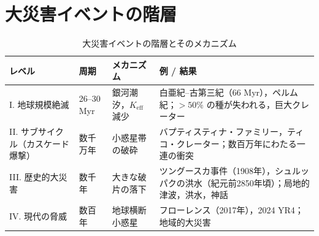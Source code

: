 \documentclass[12pt,a4paper]{article}
\begin{document}
	\section{大災害イベントの階層}
	\begin{table}[!ht]
		\centering
		\caption{大災害イベントの階層とそのメカニズム}
		\label{tab:hierarchy}
		\scriptsize
		\begin{tabular}{p{3.5cm}p{2.4cm}p{3.4cm}p{7.5cm}}
			\toprule
			\textbf{レベル} & \textbf{周期} & \textbf{メカニズム} & \textbf{例 / 結果} \\
			\midrule
			I. 地球規模絶滅 & 26–30 Myr & 銀河潮汐，\(K_{\mathrm{eff}}\) 減少 & 白亜紀–古第三紀（66 Myr），ペルム紀；\(>50\%\) の種が失われる，巨大クレーター \\
			II. サブサイクル（カスケード爆撃） & 数千万年 & 小惑星帯の破砕 & バプティスティナ・ファミリー，ティコ・クレーター；数百万年にわたる一連の衝突 \\
			III. 歴史的大災害 & 数千年 & 大きな破片の落下 & ツングースカ事件（1908年），シュルッパクの洪水（紀元前2850年頃）；局地的津波，洪水，神話 \\
			IV. 現代の脅威 & 数百年 & 地球横断小惑星 & フローレンス（2017年），2024 YR4；地域的大災害 \\
			\bottomrule
		\end{tabular}
	\end{table}
	
\end{document}
